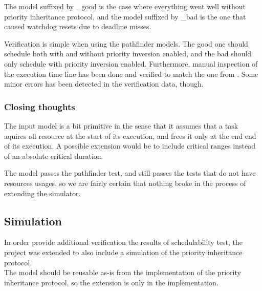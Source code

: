 \documentclass{acm_proc_article-sp}
\begin{document}
The model suffixed by \_good is the case where everything went well without priority inheritance protocol, and the model suffixed by \_bad is the one that caused watchdog resets due to deadline misses.

Verification is simple when using the pathfinder models. The good one should schedule both with and without priority inversion enabled, and the bad should only schedule with priority inversion enabled. Furthermore, manual inspection of the execution time line has been done and verified to match the one from \cite{CoDeKaMa2002.1}. Some minor errors has been detected in the verification data, though.

\subsubsection{Closing thoughts}
The input  model is a bit primitive in the sense that it assumes that a task aquires all resource at the start of its execution, and frees it only at the end end of its execution. A possible extension would be to include critical ranges instead of an absolute critical duration.

The model passes the pathfinder test, and still passes the tests that do not have resources usages, so we are fairly certain that nothing broke in the process of extending the simulator.

\subsection{Simulation}
In order provide additional verification the results of schedulability test, the project was extended to also include a simulation of the priority inheritance protocol.\\
The model should be reusable as-is from the implementation of the priority inheritance protocol, so the extension is only in the implementation.
\end{document}
